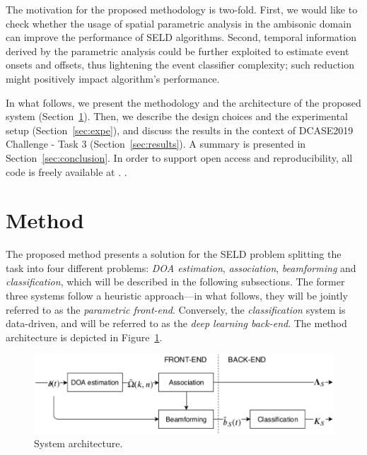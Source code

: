 The motivation for the proposed methodology is two-fold.
First, we would like to check whether the usage of spatial parametric analysis in the ambisonic domain can improve the performance of SELD algorithms.
Second, temporal information derived by the parametric analysis could be further exploited to estimate event onsets and offsets, thus lightening the event classifier complexity; such reduction might positively impact algorithm's performance.

In what follows, we present the methodology and the architecture of the proposed system (Section~\ref{sec:method}). Then, we describe the design choices and the experimental setup (Section~\ref{sec:expe}), and discuss the results in the context of DCASE2019 Challenge - Task 3 (Section~\ref{sec:results}). A summary is presented in Section~\ref{sec:conclusion}. In order to support open access and reproducibility, all code is freely available at \cite{code}. .


\section{Method}
\label{sec:method}

The proposed method presents a solution for the SELD problem splitting the task into four different problems: \textit{DOA  estimation}, \textit{association}, \textit{beamforming} and \textit{classification}, which will be described in the following subsections.
The former three systems follow a heuristic approach---in what follows, they will be jointly referred to as the \textit{parametric front-end}. Conversely, the \textit{classification} system is data-driven, and will be referred to as the \textit{deep learning back-end}. The method architecture is depicted in Figure~\ref{fig:diagram_all}.


\begin{figure}[h]
	\centering
    \includegraphics[width=\columnwidth]{Figures//SELD/dcase_challenge_tech_report_all2.pdf}
    \caption{System architecture.}
    \label{fig:diagram_all}

\end{figure}

